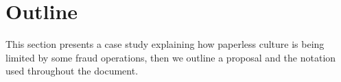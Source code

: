 \section{Outline}
\label{sec:outline}
This section presents a case study explaining how
paperless culture is being limited by some fraud 
operations, then we outline a proposal and the notation used
throughout the document.




